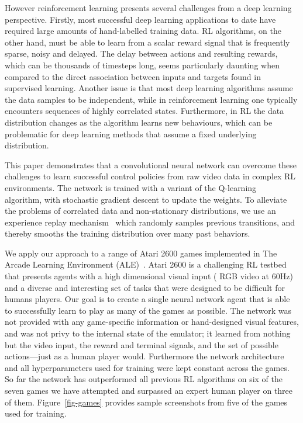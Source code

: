 \documentclass{article} \usepackage{nips13submit_e,times}
\begin{document}
However reinforcement learning presents several challenges from a deep learning perspective.
Firstly, most successful deep learning applications to date have required large amounts of hand-labelled training data.
RL algorithms, on the other hand, must be able to learn from a scalar reward signal that is frequently sparse, noisy and delayed.
The delay between actions and resulting rewards, which can be thousands of timesteps long, seems particularly daunting when compared to the direct association between inputs and targets found in supervised learning.
Another issue is that most deep learning algorithms assume the data samples to be independent, while in reinforcement learning one typically encounters sequences of highly correlated states.
Furthermore, in RL the data distribution changes as the algorithm learns new behaviours, which can be problematic for deep learning methods that assume a fixed underlying distribution.




This paper demonstrates that a convolutional neural network can overcome these challenges to learn successful control policies from raw video data in complex RL environments.
The network is trained with a variant of the Q-learning~\cite{watkins-qlearning} algorithm, with stochastic gradient descent to update the weights.
To alleviate the problems of correlated data and non-stationary distributions, we use an experience replay mechanism~\cite{lin1993reinforcement} which randomly samples previous transitions, and thereby smooths the training distribution over many past behaviors.



We apply our approach to a range of Atari 2600 games implemented in The Arcade Learning Environment (ALE)~\cite{bellemare-ale}.
Atari 2600 is a challenging RL testbed that presents agents with a high dimensional visual input ( RGB video at 60Hz) and a diverse and interesting set of tasks that were designed to be difficult for humans players.
Our goal is to create a single neural network agent that is able to successfully learn to play as many of the games as possible.
The network was not provided with any game-specific information or hand-designed visual features, and was not privy to the internal state of the emulator; it learned from nothing but the video input, the reward and terminal signals, and the set of possible actions---just as a human player would.
Furthermore the network architecture and all hyperparameters used for training were kept constant across the games.
So far the network has outperformed all previous RL algorithms on six of the seven games we have attempted and surpassed an expert human player on three of them.
Figure~\ref{fig-games} provides sample screenshots from five of the games used for training.
\end{document}
